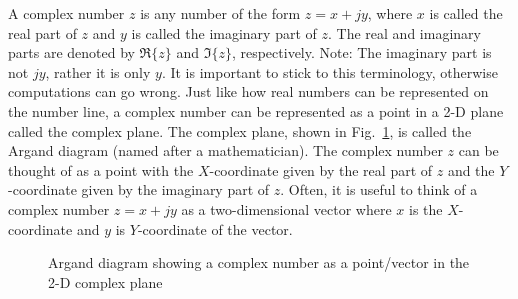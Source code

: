 A complex number $z$ is any number of the form $z = x+jy$, where $x$ is called the real part of $z$ and $y$ is called the imaginary part of $z$.
The real and imaginary parts are denoted by $\Re\{z\}$ and $\Im\{z\}$, respectively.
Note: The imaginary part is not $jy$, rather it is only $y$.
It is important to stick to this terminology, otherwise computations can go wrong.
Just like how real numbers can be represented on the number line, a complex number
can be represented as a point in a 2-D plane called the complex plane.
The complex plane, shown in Fig.~\ref{fig:argand}, is called the Argand diagram (named after a mathematician).
The complex number $z$ can be thought of as a point with the $X$-coordinate given by the real part of $z$ and the $Y$-coordinate given by the imaginary part of $z$.
Often, it is useful to think of a complex number $z = x+jy$ as a two-dimensional vector where $x$ is the $X$-coordinate and $y$ is $Y$-coordinate of the vector.

\begin{figure}[h]
\begin{center}

\caption{Argand diagram showing a complex number as a point/vector in the 2-D complex plane}
\label{fig:argand}
\end{center}
\end{figure}

